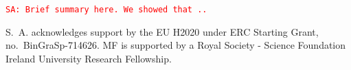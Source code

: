 \documentclass{aa}
\newcommand{\sa}[1]{{\textcolor{red}{\texttt{SA: #1}} }}
\begin{document}
\sa{Brief summary here. We showed that ..}



\begin{acknowledgements}
 S.~A. acknowledges support by the EU H2020 under ERC Starting Grant, no.~BinGraSp-714626.
 MF is supported by a Royal Society - Science Foundation Ireland University Research Fellowship.
\end{acknowledgements}




\end{document}
